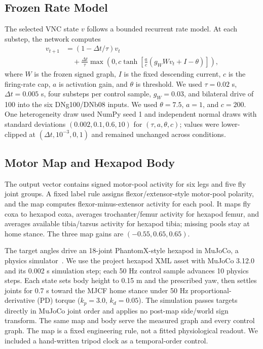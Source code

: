 \documentclass[10pt]{article}
\begin{document}
\subsection{Frozen Rate Model}
The selected VNC state $v$ follows a bounded recurrent rate model. At each substep, the network computes
\begin{equation}
  \begin{aligned}
  v_{t+1}&=(1-\Delta t/\tau)v_t\\
  &\quad+\frac{\Delta t}{\tau}\max\left(0,c\tanh\left[
  \frac{a}{c}(g_W Wv_t+I-\theta)\right]\right),
  \end{aligned}
\label{eq:vnc}
\end{equation}
where $W$ is the frozen signed graph, $I$ is the fixed descending current, $c$ is the firing-rate cap, $a$ is activation gain, and $\theta$ is threshold. We used $\tau=0.02$ s, $\Delta t=0.005$ s, four substeps per control sample, $g_W=0.03$, and bilateral drive of 100 into the six DNg100/DNb08 inputs. We used $\theta=7.5$, $a=1$, and $c=200$. One heterogeneity draw used NumPy seed 1 and independent normal draws with standard deviations $(0.002,0.1,0.6,10)$ for $(\tau,a,\theta,c)$; values were lower-clipped at $(\Delta t,10^{-3},0,1)$ and remained unchanged across conditions.

\subsection{Motor Map and Hexapod Body}
The output vector contains signed motor-pool activity for six legs and five fly joint groups. A fixed label rule assigns flexor/extensor-style motor-pool polarity, and the map computes flexor-minus-extensor activity for each pool. It maps fly coxa to hexapod coxa, averages trochanter/femur activity for hexapod femur, and averages available tibia/tarsus activity for hexapod tibia; missing pools stay at home stance. The three map gains are $(-0.55,0.65,0.65)$.

The target angles drive an 18-joint PhantomX-style hexapod in MuJoCo, a physics simulator~\cite{todorov2012mujoco}. We use the project hexapod XML asset with MuJoCo 3.12.0 and its 0.002 s simulation step; each 50 Hz control sample advances 10 physics steps. Each state sets body height to 0.15 m and the prescribed yaw, then settles joints for 0.7 s toward the MJCF home stance under 50 Hz proportional-derivative (PD) torque ($k_p=3.0$, $k_d=0.05$). The simulation passes targets directly in MuJoCo joint order and applies no post-map side/world sign transform. The same map and body serve the measured graph and every control graph. The map is a fixed engineering rule, not a fitted physiological readout. We included a hand-written tripod clock as a temporal-order control.
\end{document}
